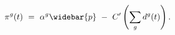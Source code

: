 \begin{equation}
\begin{split}
    \pi^{g} (t) \
    & = \ \alpha^{g} \widebar{p} \ - \ C'\left( \sum_{g} d^{g}(t) \right).
\end{split}
\label{Equation:AKS-Style-Model_Necessary-Conditions_Shadow-Price-pi}
\end{equation}
